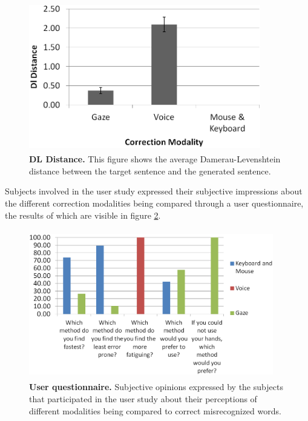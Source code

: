 \documentclass[]{article}
\begin{document}
\begin{figure}[ht]
\begin{center}
\vspace{-3mm}
\includegraphics[width=0.9\textwidth,height=65mm]{figures/dldistance.png}
\end{center}
\caption{\textbf{DL Distance.} This figure shows the average Damerau-Levenshtein distance between the target sentence and the generated
sentence.}
\label{dldistance}
\end{figure}


Subjects involved in the user study  expressed their subjective impressions about the different correction
modalities being compared through a user questionnaire, the results of which are visible in figure \ref{questionnaire}.


\begin{figure}[ht]
\begin{center}
\vspace{-3mm}
\includegraphics[width=0.95\textwidth,height=65mm]{figures/questionnaire.png}
\end{center}
\caption{\textbf{User questionnaire.} Subjective opinions expressed by the subjects that participated in the user
study about their perceptions of different modalities being compared to correct misrecognized words.}
\label{questionnaire}
\end{figure}
\end{document}
